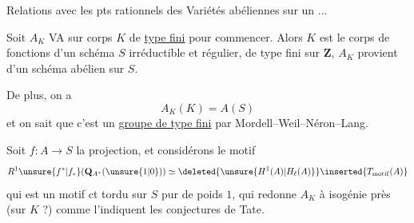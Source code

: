 \uline{}
Relations avec les pts  rationnels  des Variétés abéliennes sur un   ...

Soit $A_K$ VA sur corps $K$ de \uline{type fini} pour commencer. Alors $K$ est le corps de fonctions d'un schéma $S$ irréductible et régulier, de type fini sur $\mathbf{Z}$,   $A_K$ provient d'un schéma abélien sur $S$.

De plus, on a
\[
A_K(K)=A(S)
\]
et on sait que c'est un \uline{groupe de type fini} par Mordell--Weil--Néron--Lang.

Soit $f:A\longrightarrow S$ la projection, et considérons le motif
\[
R^1\unsure{f^*|f_*}(\mathbf{Q}_{A^*}(\unsure{1|0}))\simeq\deleted{\unsure{H^1(A)|H_\ell(A)}}\inserted{T_{\mathrm{motif}}(A)}
\]
qui est un motif ct tordu sur $S$  pur de poids $1$, qui redonne $A_K$ à isogénie près  (sur $K$ ?) comme l'indiquent les conjectures de Tate.
